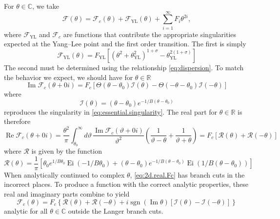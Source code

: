 \documentclass[
  aps,
  pre,
  preprint,
  longbibliography,
  floatfix
]{revtex4-2}
\begin{document}
For $\theta\in\mathbb C$, we take
\begin{equation}
  \mathcal F(\theta)=\mathcal F_c(\theta)+\mathcal F_{\mathrm{YL}}(\theta)+\sum_{i=1}^\infty F_{i}\theta^{2i},
\end{equation}
where $\mathcal F_{\textrm{YL}}$ and $\mathcal F_c$ are functions that
contribute the appropriate singularities expected at the Yang--Lee point and
the first order transition. The first is simply
\begin{equation}
  \mathcal F_{\mathrm{YL}}(\theta)=F_{\mathrm{YL}}\left[(\theta^2+\theta_{\mathrm{YL}}^2)^{1+\sigma}-\theta_{\mathrm{YL}}^{2(1+\sigma)}\right]
\end{equation}
The second must be determined using the relationship \eqref{eq:dispersion}. To
match the behavior we expect, we should have for $\theta\in\mathbb R$
\begin{equation}
  \operatorname{Im}\mathcal F_c(\theta+0i)=F_c[\Theta(\theta-\theta_0)\mathcal I(\theta)-\Theta(-\theta-\theta_0)\mathcal I(-\theta)]
\end{equation}
where
\begin{equation}
  \mathcal I(\theta)=(\theta-\theta_0)e^{-1/B(\theta-\theta_0)}
\end{equation}
reproduces the singularity in \eqref{eq:essential.singularity}.
The real part for $\theta\in\mathbb R$ is therefore
\begin{equation} \label{eq:2d.real.Fc}
  \operatorname{Re}\mathcal F_c(\theta+0i)
  =\frac{\theta^2}{\pi}
  \int_{\theta_0}^\infty d\vartheta\,\frac{\operatorname{Im}\mathcal F_c(\vartheta+0i)}{\vartheta^2}\left(\frac1{\vartheta-\theta}+\frac1{\vartheta+\theta}\right)
  =F_c[\mathcal R(\theta)+\mathcal R(-\theta)]
\end{equation}
where $\mathcal R$ is given by the function
\begin{equation}
  \mathcal R(\theta)
  =\frac1\pi\left[
    \theta_0e^{1/B\theta_0}\operatorname{Ei}(-1/B\theta_0)
    +(\theta-\theta_0)e^{-1/B(\theta-\theta_0)}\operatorname{Ei}(1/B(\theta-\theta_0))
  \right]
\end{equation}
When analytically continued to complex $\theta$, \eqref{eq:2d.real.Fc} has branch cuts in the incorrect places. To produce a function with the correct analytic properties, these real and imaginary parts combine to yield
\begin{equation}
  \mathcal F_c(\theta)=F_c\left\{
    \mathcal R(\theta)+\mathcal R(-\theta)+i\operatorname{sgn}(\operatorname{Im}\theta)[\mathcal I(\theta)-\mathcal I(-\theta)]
  \right\}
\end{equation}
analytic for all $\theta\in\mathbb C$ outside the Langer branch cuts.
\end{document}
